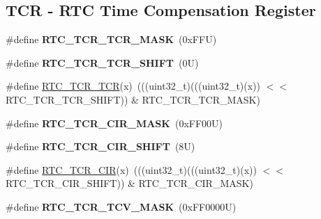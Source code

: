 \subsection*{T\+CR -\/ R\+TC Time Compensation Register}
\begin{DoxyCompactItemize}
\item 
\mbox{\label{group___r_t_c___register___masks_ga48a96d1de8db1993bfac3ca9d6bdb227}} 
\#define {\bfseries R\+T\+C\+\_\+\+T\+C\+R\+\_\+\+T\+C\+R\+\_\+\+M\+A\+SK}~(0x\+F\+F\+U)
\item 
\mbox{\label{group___r_t_c___register___masks_ga0d8bc8c79b8010b8ebb94562428713fe}} 
\#define {\bfseries R\+T\+C\+\_\+\+T\+C\+R\+\_\+\+T\+C\+R\+\_\+\+S\+H\+I\+FT}~(0\+U)
\item 
\#define \mbox{\hyperlink{group___r_t_c___register___masks_gaca21d09697f88aef5b056c81daaa8445}{R\+T\+C\+\_\+\+T\+C\+R\+\_\+\+T\+CR}}(x)~(((uint32\+\_\+t)(((uint32\+\_\+t)(x)) $<$$<$ R\+T\+C\+\_\+\+T\+C\+R\+\_\+\+T\+C\+R\+\_\+\+S\+H\+I\+FT)) \& R\+T\+C\+\_\+\+T\+C\+R\+\_\+\+T\+C\+R\+\_\+\+M\+A\+SK)
\item 
\mbox{\label{group___r_t_c___register___masks_ga8f198d1dbc7427e1dfabdc4e9f53f8e2}} 
\#define {\bfseries R\+T\+C\+\_\+\+T\+C\+R\+\_\+\+C\+I\+R\+\_\+\+M\+A\+SK}~(0x\+F\+F00\+U)
\item 
\mbox{\label{group___r_t_c___register___masks_ga4b8c9ecf8ed798b8c0173ce122874c5e}} 
\#define {\bfseries R\+T\+C\+\_\+\+T\+C\+R\+\_\+\+C\+I\+R\+\_\+\+S\+H\+I\+FT}~(8\+U)
\item 
\#define \mbox{\hyperlink{group___r_t_c___register___masks_ga2425cc5a6f775938d0c0aa5448b96b05}{R\+T\+C\+\_\+\+T\+C\+R\+\_\+\+C\+IR}}(x)~(((uint32\+\_\+t)(((uint32\+\_\+t)(x)) $<$$<$ R\+T\+C\+\_\+\+T\+C\+R\+\_\+\+C\+I\+R\+\_\+\+S\+H\+I\+FT)) \& R\+T\+C\+\_\+\+T\+C\+R\+\_\+\+C\+I\+R\+\_\+\+M\+A\+SK)
\item 
\mbox{\label{group___r_t_c___register___masks_ga920f92da02ac0a6ae0931645600e2405}} 
\#define {\bfseries R\+T\+C\+\_\+\+T\+C\+R\+\_\+\+T\+C\+V\+\_\+\+M\+A\+SK}~(0x\+F\+F0000\+U)
\item 
\mbox{\label{group___r_t_c___register___masks_ga6bcbafe57cdb430da5ee6902e0bcb224}} 

\end{DoxyCompactItemize}
